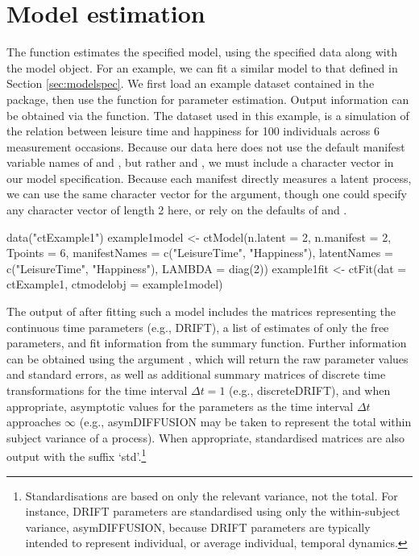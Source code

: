 \documentclass[nojss]{jss}\usepackage[]{graphicx}\usepackage[]{color}
\begin{document}
\section{Model estimation} \label{sec:modelfit}\nopagebreak
The  function estimates the specified model, using the specified data along with the  model object. For an example, we can fit a similar model to that defined in Section \ref{sec:modelspec}. We first load an example dataset contained in the  package, then use the  function for parameter estimation. Output information can be obtained via the  function. The dataset used in this example, is a simulation of the relation between leisure time and happiness for 100 individuals across 6 measurement occasions.  Because our data here does not use the default manifest variable names of  and , but rather  and , we must include a  character vector in our model specification.  Because each manifest directly measures a latent process, we can use the same character vector for the  argument, though one could specify any character vector of length 2 here, or rely on the defaults of  and . 

\begin{Schunk}
\begin{Sinput}
data("ctExample1")
example1model <- ctModel(n.latent = 2, n.manifest = 2, Tpoints = 6, 
  manifestNames = c("LeisureTime", "Happiness"), 
  latentNames = c("LeisureTime", "Happiness"), LAMBDA = diag(2))
example1fit <- ctFit(dat = ctExample1, ctmodelobj = example1model)
\end{Sinput}
\end{Schunk}

The output of  after fitting such a model includes the matrices representing the continuous time parameters (e.g., DRIFT), a list of estimates of only the free parameters, and fit information from the  summary function. Further information can be obtained using the argument , which will return the raw  parameter values and standard errors, as well as additional summary matrices of discrete time transformations for the time interval $\Delta t = 1$ (e.g., discreteDRIFT), and when appropriate, asymptotic values for the parameters as the time interval $\Delta t$ approaches $\infty $ (e.g., asymDIFFUSION may be taken to represent the total within subject variance of a process). When appropriate, standardised matrices are also output with the suffix `std'.\footnote{Standardisations are based on only the relevant variance, not the total. For instance, DRIFT parameters are standardised using only the within-subject variance, asymDIFFUSION, because DRIFT parameters are typically intended to represent individual, or average individual, temporal dynamics.}   
\end{document}
